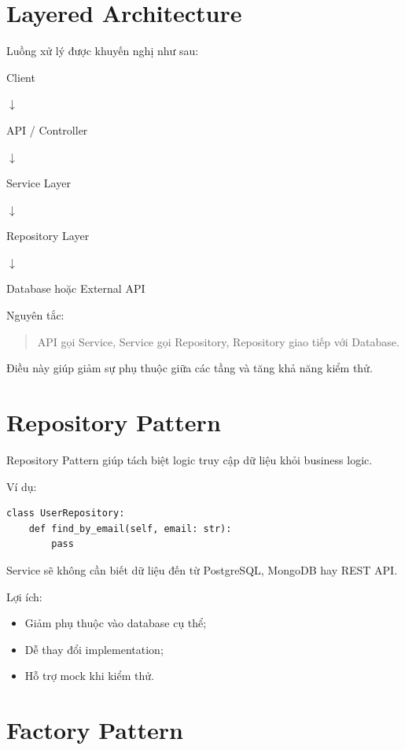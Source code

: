 \documentclass[12pt,a4paper]{article}
\begin{document}
\section{Layered Architecture}

Luồng xử lý được khuyến nghị như sau:

\begin{center}
Client

$\downarrow$

API / Controller

$\downarrow$

Service Layer

$\downarrow$

Repository Layer

$\downarrow$

Database hoặc External API
\end{center}

Nguyên tắc:

\begin{quote}
API gọi Service, Service gọi Repository, Repository giao tiếp với Database.
\end{quote}

Điều này giúp giảm sự phụ thuộc giữa các tầng và tăng khả năng kiểm thử.

\section{Repository Pattern}

Repository Pattern giúp tách biệt logic truy cập dữ liệu khỏi business logic.

Ví dụ:

\begin{lstlisting}
class UserRepository:
    def find_by_email(self, email: str):
        pass
\end{lstlisting}

Service sẽ không cần biết dữ liệu đến từ PostgreSQL, MongoDB hay REST API.

Lợi ích:

\begin{itemize}
    \item Giảm phụ thuộc vào database cụ thể;
    \item Dễ thay đổi implementation;
    \item Hỗ trợ mock khi kiểm thử.
\end{itemize}

\section{Factory Pattern}
\end{document}
